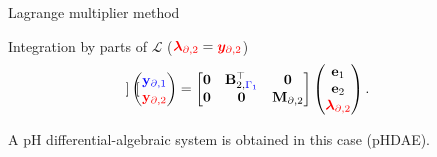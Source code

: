 \documentclass[aspectratio=169]{ISAE-Beamer}
\begin{document}
\begin{frame}{Lagrange multiplier method}
{\begin{exampleblock}{Integration by parts of $\mathcal{L}$ ($\textcolor{red}{\bm{\lambda}_{\partial, 2}} = \textcolor{red}{\bm{y}_{\partial, 2}}$)}
\begin{equation*}
\begin{aligned}
\begin{bmatrix}
	\end{bmatrix}
	\begin{pmatrix}
	\textcolor{blue}{\mathbf{y}_{\partial, 1}} \\
	\textcolor{red}{\mathbf{y}_{\partial, 2}} \\
	\end{pmatrix}
	&= \begin{bmatrix}
	\mathbf{0} & \mathbf{B}_{2, \textcolor{blue}{\Gamma_1}}^\top & \mathbf{0} \\
	\mathbf{0} & \mathbf{0} & \mathbf{M}_{\partial, 2} \\
	\end{bmatrix}\begin{pmatrix}
	\mathbf{e}_{1} \\
	\mathbf{e}_{2} \\
	\textcolor{red}{\bm{\lambda}_{\partial, 2}} \\
	\end{pmatrix}.
	\end{aligned}
	\end{equation*}
\end{exampleblock}
}
A pH differential-algebraic system is obtained in this case (pHDAE).
\end{frame}
\end{document}
